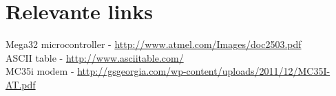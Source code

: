 \documentclass[Aflevering]{subfiles}
\begin{document}
\section{Relevante links}

Mega32 microcontroller - \url{http://www.atmel.com/Images/doc2503.pdf}
\\
ASCII table - \url{http://www.asciitable.com/}
\\
MC35i modem - \url{http://gsgeorgia.com/wp-content/uploads/2011/12/MC35I-AT.pdf}
\end{document}
